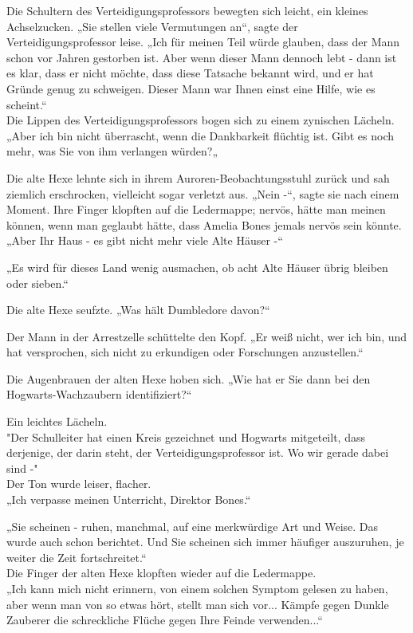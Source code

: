 {Die Schultern des Verteidigungsprofessors bewegten sich leicht, ein kleines Achselzucken. „Sie stellen viele Vermutungen an“, sagte der Verteidigungsprofessor leise. „Ich für meinen Teil würde glauben, dass der Mann schon vor Jahren gestorben ist. Aber wenn dieser Mann dennoch lebt - dann ist es klar, dass er nicht möchte, dass diese Tatsache bekannt wird, und er hat Gründe genug zu schweigen. Dieser Mann war Ihnen einst eine Hilfe, wie es scheint.“\\ Die Lippen des Verteidigungsprofessors bogen sich zu einem zynischen Lächeln. „Aber ich bin nicht überrascht, wenn die Dankbarkeit flüchtig ist. Gibt es noch mehr, was Sie von ihm verlangen würden?„

Die alte Hexe lehnte sich in ihrem Auroren-Beobachtungsstuhl zurück und sah ziemlich erschrocken, vielleicht sogar verletzt aus. „Nein -“, sagte sie nach einem Moment. Ihre Finger klopften auf die Ledermappe; nervös, hätte man meinen können, wenn man geglaubt hätte, dass Amelia Bones jemals nervös sein könnte. „Aber Ihr Haus - es gibt nicht mehr viele Alte Häuser -“

„Es wird für dieses Land wenig ausmachen, ob acht Alte Häuser übrig bleiben oder sieben.“

Die alte Hexe seufzte. „Was hält Dumbledore davon?“

Der Mann in der Arrestzelle schüttelte den Kopf. „Er weiß nicht, wer ich bin, und hat versprochen, sich nicht zu erkundigen oder Forschungen anzustellen.“

Die Augenbrauen der alten Hexe hoben sich. „Wie hat er Sie dann bei den Hogwarts-Wachzaubern identifiziert?“

Ein leichtes Lächeln.\\ "Der Schulleiter hat einen Kreis gezeichnet und Hogwarts mitgeteilt, dass derjenige, der darin steht, der Verteidigungsprofessor ist. Wo wir gerade dabei sind -"\\ Der Ton wurde leiser, flacher.\\ „Ich verpasse meinen Unterricht, Direktor Bones.“

„Sie scheinen - ruhen, manchmal, auf eine merkwürdige Art und Weise. Das wurde auch schon berichtet. Und Sie scheinen sich immer häufiger auszuruhen, je weiter die Zeit fortschreitet.“\\ Die Finger der alten Hexe klopften wieder auf die Ledermappe.\\ „Ich kann mich nicht erinnern, von einem solchen Symptom gelesen zu haben, aber wenn man von so etwas hört, stellt man sich vor... Kämpfe gegen Dunkle Zauberer die schreckliche Flüche gegen Ihre Feinde verwenden...“

}
